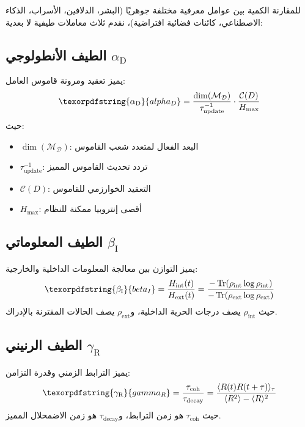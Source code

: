 \documentclass[12pt,a4paper]{article}
\DeclareMathOperator{\Tr}{Tr}
\DeclareRobustCommand{\alD}{\texorpdfstring{\ensuremath{\alpha_{\mathrm{D}}}}{alpha_D}}
\DeclareRobustCommand{\beI}{\texorpdfstring{\ensuremath{\beta_{\mathrm{I}}}}{beta_I}}
\DeclareRobustCommand{\gaR}{\texorpdfstring{\ensuremath{\gamma_{\mathrm{R}}}}{gamma_R}}
\newcommand{\Dict}{\mathcal{D}}
\newcommand{\Mdict}{\mathcal{M}_{\Dict}}
\begin{document}
	للمقارنة الكمية بين عوامل معرفية مختلفة جوهريًا (البشر، الدلافين، الأسراب، الذكاء الاصطناعي، كائنات فضائية افتراضية)، نقدم ثلاث معاملات طيفية لا بعدية:
	
	\subsection{الطيف الأنطولوجي \alD}
	
	يميز تعقيد ومرونة قاموس العامل:
	\begin{equation}
		\label{eq:alphaD}
		\alD = \frac{\dim(\Mdict)}{\tau_{\mathrm{update}}^{-1}} \cdot \frac{\mathcal{C}(D)}{H_{\mathrm{max}}}
	\end{equation}
	حيث:
	\begin{itemize}
		\item \(\dim(\Mdict)\): البعد الفعال لمتعدد شعب القاموس
		\item \(\tau_{\mathrm{update}}^{-1}\): تردد تحديث القاموس المميز
		\item \(\mathcal{C}(D)\): التعقيد الخوارزمي للقاموس
		\item \(H_{\mathrm{max}}\): أقصى إنتروبيا ممكنة للنظام
	\end{itemize}
	
	\subsection{الطيف المعلوماتي \beI}
	
	يميز التوازن بين معالجة المعلومات الداخلية والخارجية:
	\begin{equation}
		\label{eq:betaI}
		\beI = \frac{H_{\mathrm{int}}(t)}{H_{\mathrm{ext}}(t)} = \frac{-\Tr(\rho_{\mathrm{int}}\log\rho_{\mathrm{int}})}{-\Tr(\rho_{\mathrm{ext}}\log\rho_{\mathrm{ext}})}
	\end{equation}
	حيث \(\rho_{\mathrm{int}}\) يصف درجات الحرية الداخلية، و\(\rho_{\mathrm{ext}}\) يصف الحالات المقترنة بالإدراك.
	
	\subsection{الطيف الرنيني \gaR}
	
	يميز الترابط الزمني وقدرة التزامن:
	\begin{equation}
		\label{eq:gammaR}
		\gaR = \frac{\tau_{\mathrm{coh}}}{\tau_{\mathrm{decay}}} = \frac{\langle R(t)R(t+\tau)\rangle_\tau}{\langle R^2\rangle - \langle R\rangle^2}
	\end{equation}
	حيث \(\tau_{\mathrm{coh}}\) هو زمن الترابط، و\(\tau_{\mathrm{decay}}\) هو زمن الاضمحلال المميز.
	
\end{document}
